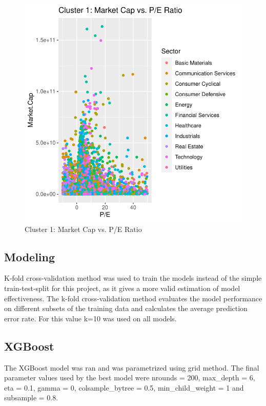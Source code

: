 \documentclass[11pt,]{article}
\begin{document}
\begin{figure}

{\centering \includegraphics{stock_analysis_files/figure-latex/pe ratio clust1-1} 

}

\caption{Cluster 1: Market Cap vs. P/E Ratio}\label{fig:pe ratio clust1}
\end{figure}

\hypertarget{modeling}{%
\subsection{Modeling}\label{modeling}}

K-fold cross-validation method was used to train the models instead of
the simple train-test-split for this project, as it gives a more valid
estimation of model effectiveness. The k-fold cross-validation method
evaluates the model performance on different subsets of the training
data and calculates the average prediction error rate. For this value
k=10 was used on all models.

\hypertarget{xgboost}{%
\subsection{XGBoost}\label{xgboost}}

The XGBoost model was ran and was parametrized using grid method. The
final parameter values used by the best model were nrounds = 200,
max\_depth = 6, eta = 0.1, gamma = 0, colsample\_bytree = 0.5,
min\_child\_weight = 1 and subsample = 0.8.
\end{document}
